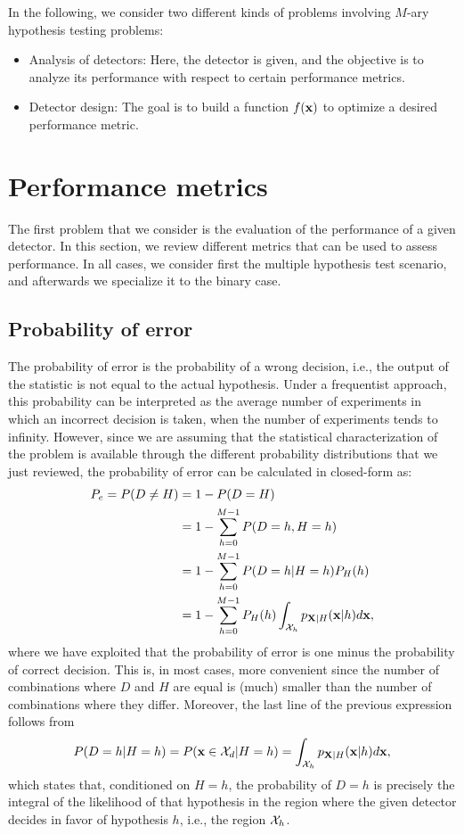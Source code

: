 In the following, we consider two different kinds of problems involving $M$-ary hypothesis testing problems:
\begin{itemize}
\item Analysis of detectors: Here, the detector is given, and the objective is to analyze its performance with respect to certain performance metrics.
\item Detector design: The goal is to build a function $f(\bf x)$ to optimize a desired performance metric.
\end{itemize}

\section{Performance metrics}
\label{subsec:analysis}

The first problem that we consider is the evaluation of the performance of a given detector. In this section, we review different metrics that can be used to assess performance. In all cases, we consider first the multiple hypothesis test scenario, and afterwards we specialize it to the binary case.

\subsection{Probability of error}

The probability of error is the probability of a wrong decision, i.e., the output of the statistic is not equal to the actual hypothesis. Under a frequentist approach, this probability can be interpreted as the average number of experiments in which an incorrect decision is taken, when the number of experiments tends to infinity. However, since we are assuming that the statistical characterization of the problem is available through the different probability distributions that we just reviewed, the probability of error can be calculated in closed-form as:
\begin{align}
    P_e = P(D\neq H) & = 1 - P(D=H) \nonumber \\
    & = 1 - \sum_{h=0}^{M-1} P(D=h, H=h) \nonumber \\
    & = 1 - \sum_{h=0}^{M-1} P(D=h| H=h) P_H(h) \nonumber \\
    & = 1 - \sum_{h=0}^{M-1} P_H(h) \int_{{\cal X}_h} p_{{\bf X}|H}({\bf x}|h) d{\bf x},\nonumber
\end{align}
where we have exploited that the probability of error is one minus the probability of correct decision. This is, in most cases, more convenient since the number of combinations where $D$ and $H$ are equal is (much) smaller than the number of combinations where they differ. Moreover, the last line of the previous expression follows from
$$P(D=h| H=h) = P({\bf x}\in {\cal X}_d| H=h) = \int_{{\cal X}_h} p_{{\bf X}|H}({\bf x}|h) d{\bf x},$$
which states that, conditioned on $H=h$, the probability of $D=h$ is precisely the integral of the likelihood of that hypothesis in the region where the given detector decides in favor of hypothesis $h$, i.e., the region ${\cal X}_h$.

